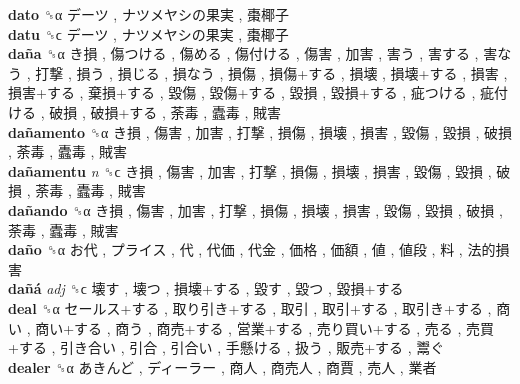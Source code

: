 \textbf{dato} ␝α   デーツ ,  ナツメヤシの果実 ,  棗椰子   \\
\textbf{datu} ␝ϲ   デーツ ,  ナツメヤシの果実 ,  棗椰子   \\
\textbf{daña} ␝α   き損 ,  傷つける ,  傷める ,  傷付ける ,  傷害 ,  加害 ,  害う ,  害する ,  害なう ,  打撃 ,  損う ,  損じる ,  損なう ,  損傷 ,  損傷+する ,  損壊 ,  損壊+する ,  損害 ,  損害+する ,  棄損+する ,  毀傷 ,  毀傷+する ,  毀損 ,  毀損+する ,  疵つける ,  疵付ける ,  破損 ,  破損+する ,  荼毒 ,  蠹毒 ,  賊害   \\
\textbf{dañamento} ␝α   き損 ,  傷害 ,  加害 ,  打撃 ,  損傷 ,  損壊 ,  損害 ,  毀傷 ,  毀損 ,  破損 ,  荼毒 ,  蠹毒 ,  賊害   \\
\textbf{dañamentu} \emph{n}  ␝ϲ   き損 ,  傷害 ,  加害 ,  打撃 ,  損傷 ,  損壊 ,  損害 ,  毀傷 ,  毀損 ,  破損 ,  荼毒 ,  蠹毒 ,  賊害   \\
\textbf{dañando} ␝α   き損 ,  傷害 ,  加害 ,  打撃 ,  損傷 ,  損壊 ,  損害 ,  毀傷 ,  毀損 ,  破損 ,  荼毒 ,  蠹毒 ,  賊害   \\
\textbf{daño} ␝α   お代 ,  プライス ,  代 ,  代価 ,  代金 ,  価格 ,  価額 ,  値 ,  値段 ,  料 ,  法的損害   \\
\textbf{dañá} \emph{adj}  ␝ϲ   壊す ,  壊つ ,  損壊+する ,  毀す ,  毀つ ,  毀損+する   \\
\textbf{deal} ␝α   セールス+する ,  取り引き+する ,  取引 ,  取引+する ,  取引き+する ,  商い ,  商い+する ,  商う ,  商売+する ,  営業+する ,  売り買い+する ,  売る ,  売買+する ,  引き合い ,  引合 ,  引合い ,  手懸ける ,  扱う ,  販売+する ,  鬻ぐ   \\
\textbf{dealer} ␝α   あきんど ,  ディーラー ,  商人 ,  商売人 ,  商賈 ,  売人 ,  業者   \\
